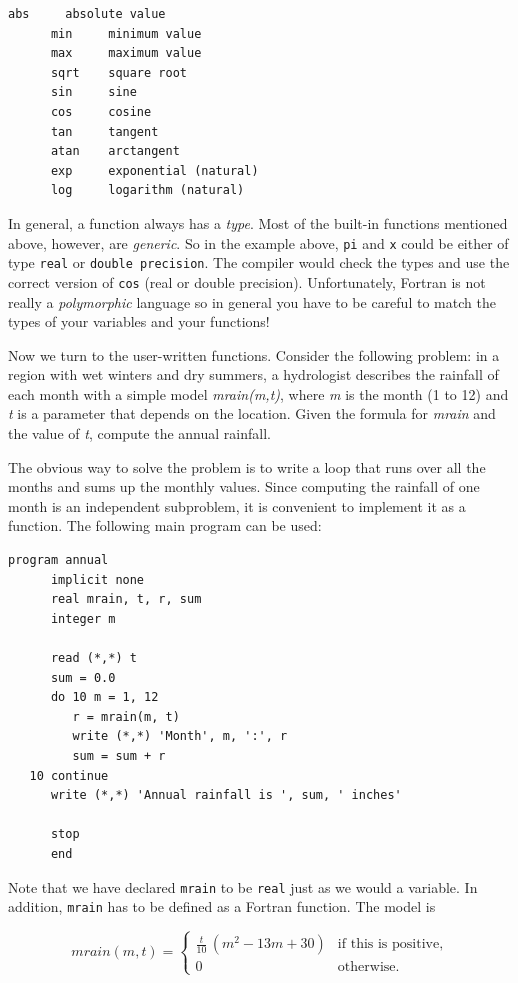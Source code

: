 \begin{lstlisting}[style=fortran77]
      abs     absolute value
      min     minimum value
      max     maximum value
      sqrt    square root
      sin     sine
      cos     cosine
      tan     tangent
      atan    arctangent
      exp     exponential (natural)
      log     logarithm (natural)
\end{lstlisting}

In general, a function always has a \emph{type}. Most of the built-in functions mentioned above, however, are \emph{generic}. So in the example above, \texttt{pi} and \texttt{x} could be either of type \texttt{real} or \texttt{double precision}. The compiler would check the types and use the correct version of \texttt{cos} (real or double precision). Unfortunately, Fortran is not really a \emph{polymorphic} language so in general you have to be careful to match the types of your variables and your functions!

Now we turn to the user-written functions. Consider the following problem: in a region with wet winters and dry summers, a hydrologist describes the rainfall of each month with a simple model \emph{mrain(m,t)}, where \emph{m} is the month (1 to 12) and \emph{t} is a parameter that depends on the location. Given the formula for \emph{mrain} and the value of \emph{t}, compute the annual rainfall.

The obvious way to solve the problem is to write a loop that runs over all the months and sums up the monthly values. Since computing the rainfall of one month is an independent subproblem, it is convenient to implement it as a function. The following main program can be used:

\begin{lstlisting}[style=fortran77]
      program annual
      implicit none
      real mrain, t, r, sum
      integer m

      read (*,*) t
      sum = 0.0
      do 10 m = 1, 12
         r = mrain(m, t)
         write (*,*) 'Month', m, ':', r
         sum = sum + r
   10 continue
      write (*,*) 'Annual rainfall is ', sum, ' inches'

      stop
      end
\end{lstlisting}

Note that we have declared \texttt{mrain} to be \texttt{real} just as we would a variable. In addition, \texttt{mrain} has to be defined as a Fortran function. The model is

\[
mrain(m,t) = \begin{cases}
  \frac{t}{10}\,(m^2 - 13m + 30) & \text{if this is positive,} \\
  0 & \text{otherwise.}
\end{cases}
\]

